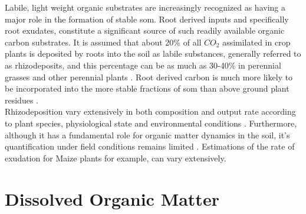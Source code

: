 	Labile, light weight organic substrates are increasingly recognized as having a major role in the formation of stable \gls{som}.
	Root derived inputs and specifically root exudates, constitute a significant source of such readily available organic carbon substrates.  It is assumed that about 20\% of all $ CO_2 $ assimilated in crop plants is deposited by roots into the soil as labile substances, generally referred to as rhizodeposits, and this percentage can be as much as 30-40\% in perennial grasses and other perennial plants \citep{kuzyakov2004, pausch2013, pausch2018}. Root derived carbon is much more likely to be incorporated into the more stable fractions of \gls{som} than above ground plant residues \citep{austin2017, kong2010, puget2001, rasse2005}.\\
	Rhizodeposition vary extensively in both composition and output rate according to plant species, physiological state and environmental conditions \citep{dennis2010, pausch2018, jones2004}. Furthermore, although it has a fundamental role for organic matter dynamics in the soil, it’s quantification under field conditions remains limited \citep{pausch2018}. Estimations of the rate of exudation for Maize plants for example, can vary extensively\citep{nguyen2003, pausch2018}.

\section{Dissolved Organic Matter}

